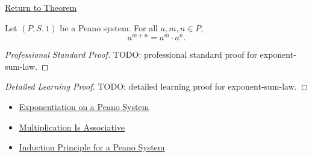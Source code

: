 \newpage
{}
\label{prf:exponent-sum-law}

\begin{remark*}[Return]
\hyperref[thm:exponent-sum-law]{Return to Theorem}
\end{remark*}

\begin{theorem*}
Let $(P,S,1)$ be a Peano system. For all $a,m,n \in P$,
\[
a^{m+n} = a^m \cdot a^n.
\]
\end{theorem*}

\begin{proof}[Professional Standard Proof]
\LRAProofBodyStart
TODO: professional standard proof for exponent-sum-law.
\end{proof}

\begin{proof}[Detailed Learning Proof]
\LRAProofBodyStart
TODO: detailed learning proof for exponent-sum-law.
\end{proof}

\begin{remark*}
\end{remark*}

\begin{dependencies}
\begin{itemize}
  \item \hyperref[def:exponentiation-on-peano-system]{Exponentiation on a Peano System}
  \item \hyperref[thm:multiplication-associative]{Multiplication Is Associative}
  \item \hyperref[thm:induction-principle-for-peano-system]{Induction Principle for a Peano System}
\end{itemize}
\end{dependencies}

\clearpage
